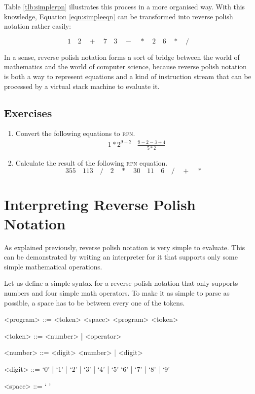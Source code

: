 \documentclass[a4paper,twocolumn]{article}
\begin{document}
Table \ref{tlb:simplerpn} illustrates this process in a more organised way. With this knowledge, Equation \ref{eqn:simpleeqn} can be transformed into reverse polish notation rather easily:

\begin{equation}
1\quad2\quad+\quad7\quad3\quad-\quad*\quad2\quad6\quad*\quad/  
\end{equation}

In a sense, reverse polish notation forms a sort of bridge between the world of mathematics and the world of computer science, because reverse polish notation is both a way to represent equations and a kind of instruction stream that can be processed by a virtual stack machine to evaluate it.

\subsection*{Exercises}

\begin{enumerate}
  \item Convert the following equations to \textsc{rpn}.
  \begin{align*}
    &{1 * 2}^{9 - 2} &
    \frac{9 - 2 - 3 + 4}{5 * 2}
  \end{align*}
  
  \item Calculate the result of the following \textsc{rpn} equation.
  \begin{equation*}
    355\quad113\quad/\quad2\quad*\quad30\quad11\quad6\quad/\quad+\quad*
  \end{equation*}
\end{enumerate}

\section{Interpreting Reverse Polish Notation}

As explained previously, reverse polish notation is very simple to evaluate. This can be demonstrated by writing an interpreter for it that supports only some simple mathematical operations.

Let us define a simple syntax for a reverse polish notation that only supports numbers and four simple math operators. To make it as simple to parse as possible, a space has to be between every one of the tokens.

\setlength{\grammarindent}{4em}
\begin{grammar}

<program> ::= <token> <space> <program>
              \alt <token>

<token> ::= <number> | <operator>

<number> ::= <digit> <number> | <digit>

<digit> ::= ‘0’ | ‘1’ | ‘2’ | ‘3’ | ‘4’ | ‘5’
\alt ‘6’ | ‘7’ | ‘8’ | ‘9’

<space> ::= ‘ ’ 

\end{grammar}
\end{document}
